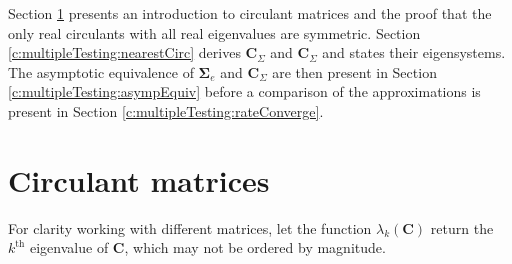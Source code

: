 \documentclass[letterpaper,12pt,oneside,final]{article}
\newcommand{\m}[1]{\mathbf{#1}}               %
\newcommand{\sm}[1]{\boldsymbol{#1}}   %
\begin{document}
Section \ref{c:multipleTesting:circDecom} presents an introduction to circulant matrices and the proof that the only real circulants with all real eigenvalues are symmetric. Section \ref{c:multipleTesting:nearestCirc} derives $\m{C}_{\Sigma}$ and $\m{C}_{\Sigma}$ and states their eigensystems. The asymptotic equivalence of $\sm{\Sigma}_e$ and $\m{C}_{\Sigma}$ are then present in Section \ref{c:multipleTesting:asympEquiv} before a comparison of the approximations is present in Section \ref{c:multipleTesting:rateConverge}.

\section{Circulant matrices} \label{c:multipleTesting:circDecom}

For clarity working with different matrices, let the function $\lambda_k(\m{C})$ return the $k^{\text{th}}$ eigenvalue of $\m{C}$, which may not be ordered by magnitude.
\end{document}

